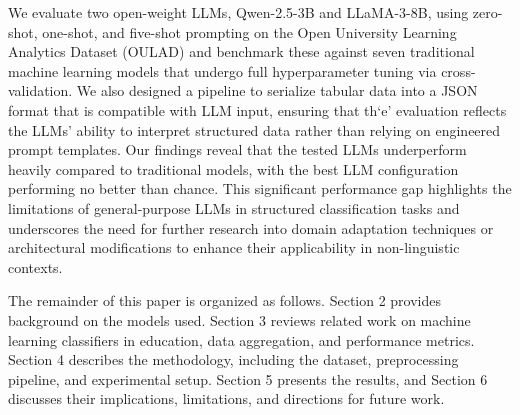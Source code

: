 We evaluate two open-weight LLMs, Qwen-2.5-3B and LLaMA-3-8B, using zero-shot, one-shot, and five-shot prompting on the Open University Learning Analytics Dataset (OULAD) \cite{Kuzilek2017} and benchmark these against seven traditional machine learning models that undergo full hyperparameter tuning via cross-validation. We also designed a pipeline to serialize tabular data into a JSON format that is compatible with LLM input, ensuring that th`e' evaluation reflects the LLMs' ability to interpret structured data rather than relying on engineered prompt templates. Our findings reveal that the tested LLMs underperform heavily compared to traditional models, with the best LLM configuration performing no better than chance. This significant performance gap highlights the limitations of general-purpose LLMs in structured classification tasks and underscores the need for further research into domain adaptation techniques or architectural modifications to enhance their applicability in non-linguistic contexts.

The remainder of this paper is organized as follows. Section 2 provides background on the models used. Section 3 reviews related work on machine learning classifiers in education, data aggregation, and performance metrics. Section 4 describes the methodology, including the dataset, preprocessing pipeline, and experimental setup. Section 5 presents the results, and Section 6 discusses their implications, limitations, and directions for future work.